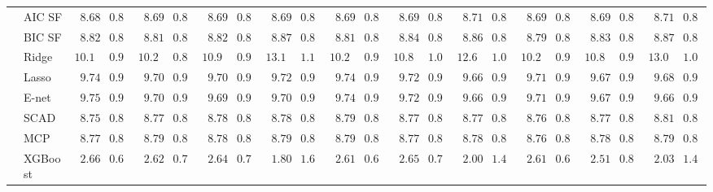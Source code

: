 \begin{tabular}{p{0.2cm}p{1cm}|p{0.6cm}p{0.6cm}|p{0.6cm}p{0.6cm}p{0.6cm}p{0.6cm}p{0.6cm}p{0.6cm}|p{0.6cm}p{0.6cm}p{0.6cm}p{0.6cm}p{0.6cm}p{0.6cm}|p{0.6cm}p{0.6cm}p{0.6cm}p{0.6cm}p{0.6cm}p{0.6cm}}
 & AIC SF  & $\phantom{0}8.68$ & $0.80$ & $\phantom{0}8.69$ & $0.82$ & $\phantom{0}8.69$ & $0.82$ & $\phantom{0}8.69$ & $0.82$ & $\phantom{0}8.69$ & $0.81$ & $\phantom{0}8.69$ & $0.82$ & $\phantom{0}8.71$ & $0.82$ & $\phantom{0}8.69$ & $0.81$ & $\phantom{0}8.69$ & $0.81$ & $\phantom{0}8.71$ & $0.82$ \\
 & BIC SF  & $\phantom{0}8.82$ & $0.83$ & $\phantom{0}8.81$ & $0.84$ & $\phantom{0}8.82$ & $0.81$ & $\phantom{0}8.87$ & $0.83$ & $\phantom{0}8.81$ & $0.83$ & $\phantom{0}8.84$ & $0.83$ & $\phantom{0}8.86$ & $0.85$ & $\phantom{0}8.79$ & $0.83$ & $\phantom{0}8.83$ & $0.82$ & $\phantom{0}8.87$ & $0.84$ \\
 & Ridge  & $10.11$ & $0.95$ & $10.25$ & $0.87$ & $10.96$ & $0.91$ & $13.15$ & $1.14$ & $10.26$ & $0.94$ & $10.89$ & $1.02$ & $12.66$ & $1.06$ & $10.27$ & $0.93$ & $10.84$ & $0.91$ & $13.06$ & $1.07$ \\
 & Lasso  & $\phantom{0}9.74$ & $0.97$ & $\phantom{0}9.70$ & $0.97$ & $\phantom{0}9.70$ & $0.96$ & $\phantom{0}9.72$ & $0.98$ & $\phantom{0}9.74$ & $0.97$ & $\phantom{0}9.72$ & $0.97$ & $\phantom{0}9.66$ & $0.99$ & $\phantom{0}9.71$ & $0.98$ & $\phantom{0}9.67$ & $0.99$ & $\phantom{0}9.68$ & $0.97$ \\
 & E-net  & $\phantom{0}9.75$ & $0.99$ & $\phantom{0}9.70$ & $0.97$ & $\phantom{0}9.69$ & $0.97$ & $\phantom{0}9.70$ & $0.97$ & $\phantom{0}9.74$ & $0.99$ & $\phantom{0}9.72$ & $0.98$ & $\phantom{0}9.66$ & $0.98$ & $\phantom{0}9.71$ & $0.97$ & $\phantom{0}9.67$ & $0.99$ & $\phantom{0}9.66$ & $0.97$ \\
 & SCAD  & $\phantom{0}8.75$ & $0.80$ & $\phantom{0}8.77$ & $0.83$ & $\phantom{0}8.78$ & $0.80$ & $\phantom{0}8.78$ & $0.84$ & $\phantom{0}8.79$ & $0.80$ & $\phantom{0}8.77$ & $0.81$ & $\phantom{0}8.77$ & $0.85$ & $\phantom{0}8.76$ & $0.82$ & $\phantom{0}8.77$ & $0.80$ & $\phantom{0}8.81$ & $0.85$ \\
 & MCP  & $\phantom{0}8.77$ & $0.80$ & $\phantom{0}8.79$ & $0.82$ & $\phantom{0}8.78$ & $0.80$ & $\phantom{0}8.79$ & $0.85$ & $\phantom{0}8.79$ & $0.81$ & $\phantom{0}8.77$ & $0.80$ & $\phantom{0}8.78$ & $0.85$ & $\phantom{0}8.76$ & $0.82$ & $\phantom{0}8.78$ & $0.80$ & $\phantom{0}8.79$ & $0.84$ \\
 & XGBoost  & $\phantom{0}2.66$ & $0.62$ & $\phantom{0}2.62$ & $0.72$ & $\phantom{0}2.64$ & $0.74$ & $\phantom{0}1.80$ & $1.62$ & $\phantom{0}2.61$ & $0.68$ & $\phantom{0}2.65$ & $0.71$ & $\phantom{0}2.00$ & $1.45$ & $\phantom{0}2.61$ & $0.63$ & $\phantom{0}2.51$ & $0.84$ & $\phantom{0}2.03$ & $1.41$ \\

\end{tabular}
